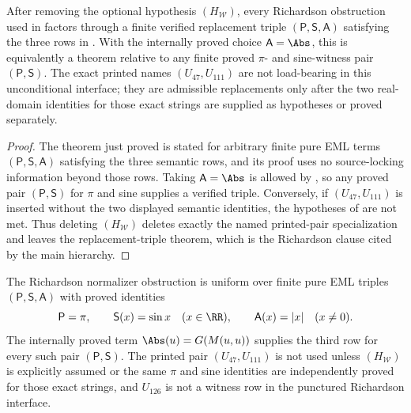 \begin{corollary}
\label{cor:unconditional-richardson-replacement-interface}
\label{cor:printed-richardson-names-not-load-bearing}
After removing the optional hypothesis \((H_{\mathcal W})\), every Richardson
obstruction used in
factors through a finite verified replacement triple
\((\mathsf P,\mathsf S,\mathsf A)\) satisfying the three rows in
.  With the internally proved
choice \(\mathsf A=\Abs\), this is equivalently a theorem relative to any finite
proved \(\pi\)- and sine-witness pair \((\mathsf P,\mathsf S)\).  The exact printed
names \((U_{47},U_{111})\) are not load-bearing in this unconditional interface;
they are admissible replacements only after the two real-domain identities for
those exact strings are supplied as hypotheses or proved separately.
\end{corollary}

\begin{proof}
The theorem just proved is stated for arbitrary finite pure EML terms
\((\mathsf P,\mathsf S,\mathsf A)\) satisfying the three semantic rows, and its
proof uses no source-locking information beyond those rows.  Taking
\(\mathsf A=\Abs\) is allowed by , so any
proved pair \((\mathsf P,\mathsf S)\) for \(\pi\) and sine supplies a verified
triple.  Conversely, if \((U_{47},U_{111})\) is inserted without the two displayed
semantic identities, the hypotheses of
 are not met.  Thus deleting
\((H_{\mathcal W})\) deletes exactly the named printed-pair specialization and
leaves the replacement-triple theorem, which is the Richardson clause cited by
the main hierarchy.
\end{proof}

\begin{theorem}
\label{thm:relative-finite-richardson-fragment}
The Richardson normalizer obstruction is uniform over finite pure EML triples
\((\mathsf P,\mathsf S,\mathsf A)\) with proved identities
\[
  \mathsf P=\pi,
  \qquad \mathsf S(x)=\sin x\quad(x\in\RR),
  \qquad \mathsf A(x)=|x|\quad(x\ne0).
\]
The internally proved term \(\Abs(u)=G(M(u,u))\) supplies the third row for every
such pair \((\mathsf P,\mathsf S)\).  The printed pair \((U_{47},U_{111})\) is not
used unless \((H_{\mathcal W})\) is explicitly assumed or the same \(\pi\) and
sine identities are independently proved for those exact strings, and
\(U_{126}\) is not a witness row in the punctured Richardson interface.
\end{theorem}

